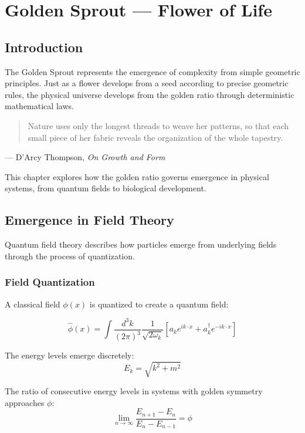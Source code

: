 \chapter{Golden Sprout — Flower of Life}
\label{ch:7}

\section{Introduction}

The Golden Sprout represents the emergence of complexity from simple geometric principles. Just as a flower develops from a seed according to precise geometric rules, the physical universe develops from the golden ratio through deterministic mathematical laws.

\begin{quote}
Nature uses only the longest threads to weave her patterns, so that each small piece of her fabric reveals the organization of the whole tapestry.
\end{quote}
— D'Arcy Thompson, \textit{On Growth and Form}

This chapter explores how the golden ratio governs emergence in physical systems, from quantum fields to biological development.

\section{Emergence in Field Theory}

Quantum field theory describes how particles emerge from underlying fields through the process of quantization.

\subsection{Field Quantization}

A classical field $\phi(x)$ is quantized to create a quantum field:

\begin{equation}
\hat{\phi}(x) = \int \frac{d^3k}{(2\pi)^3} \frac{1}{\sqrt{2\omega_k}} [a_k e^{ik\cdot x} + a_k^\dagger e^{-ik\cdot x}]
\end{equation}

The energy levels emerge discretely:
\begin{equation}
E_k = \sqrt{k^2 + m^2}
\end{equation}

\begin{proposition}
\label{prop:golden-energy}
The ratio of consecutive energy levels in systems with golden symmetry approaches $\phi$:
\begin{equation}
\lim_{n \to \infty} \frac{E_{n+1} - E_n}{E_n - E_{n-1}} = \phi
\end{equation}
\end{proposition}

